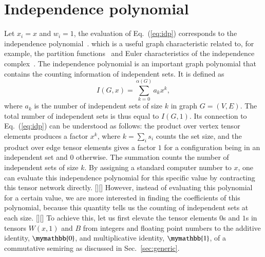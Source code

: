 \documentclass[onefignum, onetabnum]{siamart190516}
\newcommand{\<}{\langle}
\renewcommand{\>}{\rangle}
\newcommand{\Eq}[1]{Eq.~(\ref{#1})}
\newcommand{\blue}[1]{[{\bf  \color{blue}{JG: #1}}]}
\newcommand{\purple}[1]{[{\bf  \color{purple}{MC: #1}}]}
\newcounter{example}
\begin{document}
\section{Independence polynomial}\label{sec:indpoly}
Let $x_i = x$ and $w_i = 1$, the evaluation of \Eq{eq:idp} corresponds to the independence polynomial~\cite{Harvey2018,Ferrin2014}.
which is a useful graph characteristic related to, for example, the partition functions~\cite{Lee1952,Yang1952} and Euler characteristics of the independence complex~\cite{Bousquet2008, Levit2009}.
The independence polynomial is an important graph polynomial that contains the counting information of independent sets. It is defined as
\begin{equation}\label{eq:idpdef}
I(G, x) = \sum_{k=0}^{\alpha(G)} a_k x^k,
\end{equation}
where $a_k$ is the number of independent sets of size $k$ in graph $G=(V,E)$. The total number of independent sets is thus equal to $I(G, 1)$.
Its connection to \Eq{eq:idp} can be understood as follows: the product over vertex tensor elements produces a factor $x^k$, where $k=\sum_i s_i$ counts the set size,
and the product over edge tensor elements gives a factor $1$ for a configuration being in an independent set and $0$ otherwise. The summation counts the number of independent sets of size $k$. 
By assigning a standard computer number to $x$, one can evaluate this independence polynomial for this specific value by contracting this tensor network directly.
\purple{By feed in standard computer number types into the network, do you mean for
x? Then, you look at multiple x, you can fit the independence polynomial to solve for
the coefficients? It's not very explicit this procedure works at this point.}\blue{how about now?}
However, instead of evaluating this polynomial for a certain value, we are more interested in finding the coefficients of this polynomial, because this quantity tells us the counting of independent sets at each size.
\purple{Does the previous technique
(contracting the tensor network numerically) give the coefficients of the polynomial?
The use of the word “however” here is confusing to me because it feels like you're
saying that the previous technique doesn't give the coefficients, or it's very hard to
obtain the coefficients.}\blue{Yep, we haven't found the coefficients. I tried to modify words a bit, does it look better now?}
To achieve this, let us first elevate the tensor elements $0$s and $1$s in tensors $W(x, 1)$ and $B$ from integers and floating point numbers to the additive identity,
$\mymathbb{0}$, and multiplicative identity, $\mymathbb{1}$, of a commutative semiring as discussed in Sec.~\ref{sec:generic}.
\end{document}
